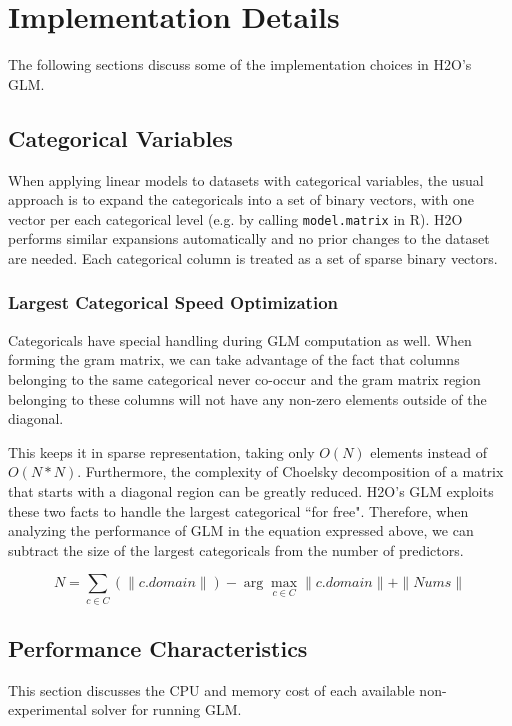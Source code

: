 \section{Implementation Details}

The following sections discuss some of the implementation choices in H2O's GLM.

\subsection{Categorical Variables}

When applying linear models to datasets with categorical variables, the usual approach is to expand the
categoricals into a set of binary vectors, with one vector per each categorical level (e.g. by calling
{\texttt{model.matrix}} in R). H2O performs similar expansions automatically and no prior changes to the dataset
are needed. Each categorical column is treated as a set of sparse binary vectors.

\subsubsection{Largest Categorical Speed Optimization}

Categoricals have special handling during GLM computation as well. When forming the gram matrix, we can take
advantage of the fact that columns belonging to the same categorical never co-occur and the gram matrix region
belonging to these columns will not have any non-zero elements outside of the diagonal. 

This keeps it in sparse representation, taking only $O(N)$ elements instead of $O(N*N)$. Furthermore, the complexity of Choelsky
decomposition of a matrix that starts with a diagonal region can be greatly reduced. H2O's GLM exploits these two
facts to handle the largest categorical ``for free". Therefore, when analyzing the performance of GLM in the
equation expressed above, we can subtract the size of the largest categoricals from the number of predictors.

$$N = \sum_{c \in C} (\|c.domain\|) - \arg\max_{c \in C} \|c.domain\| + \|Nums\| $$

\subsection{Performance Characteristics}

This section discusses the CPU and memory cost of each available non-experimental solver for running GLM.

